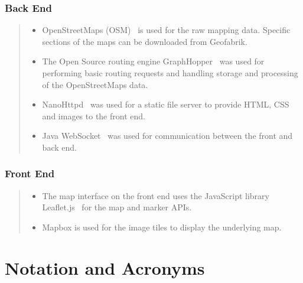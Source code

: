 \documentclass[ %
                    author={Alexander Hill},
                supervisor={Dr. Benjamin Sach},
                    degree={MEng},
                     title={MARMOSET: Multi Agent Real-time Multi-core Online
                     Simulation for Efficient Transportation},
                  subtitle={},
                      type={research},
                      year={2016} ]{dissertation}
\begin{document}
\subsection*{Back End}
\begin{quote}
\noindent
\begin{itemize}
    \item OpenStreetMaps (OSM)~\cite{osm} is used for the raw mapping data. Specific sections of
        the maps can be downloaded from Geofabrik.
    \item The Open Source routing engine GraphHopper~\cite{graphhopper} was
        used for performing basic routing requests and handling storage and
        processing of the OpenStreetMaps data.
    \item NanoHttpd~\cite{nanohttpd} was used for a static file server to
        provide HTML, CSS and images to the front end.
    \item Java WebSocket~\cite{javawebsocket} was used for communication
        between the front and back end.
\end{itemize}
\end{quote}

\subsection*{Front End}
\begin{quote}
\noindent
\begin{itemize}
    \item The map interface on the front end uses the JavaScript library
        Leaflet.js~\cite{leaflet} for the map and marker APIs.
    \item Mapbox is used for the image tiles to display the underlying map.
\end{itemize}
\end{quote}



\chapter*{Notation and Acronyms}


\end{document}
